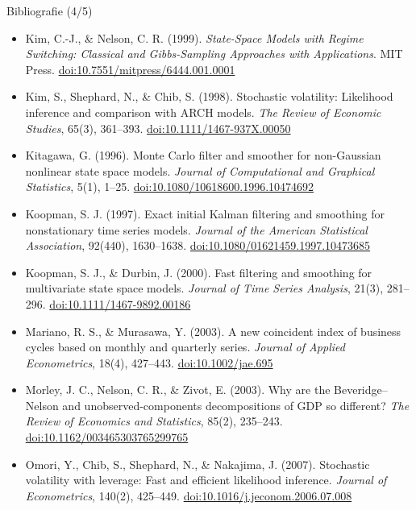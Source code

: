 \begin{frame}{Bibliografie (4/5)}
\itemsize{\tiny}
\begin{itemize}
    \item Kim, C.-J., \& Nelson, C. R. (1999). \textit{State-Space Models with Regime Switching: Classical and Gibbs-Sampling Approaches with Applications}. MIT Press. \href{https://doi.org/10.7551/mitpress/6444.001.0001}{doi:10.7551/mitpress/6444.001.0001}
    \item Kim, S., Shephard, N., \& Chib, S. (1998). Stochastic volatility: Likelihood inference and comparison with ARCH models. \textit{The Review of Economic Studies}, 65(3), 361--393. \href{https://doi.org/10.1111/1467-937X.00050}{doi:10.1111/1467-937X.00050}
    \item Kitagawa, G. (1996). Monte Carlo filter and smoother for non-Gaussian nonlinear state space models. \textit{Journal of Computational and Graphical Statistics}, 5(1), 1--25. \href{https://doi.org/10.1080/10618600.1996.10474692}{doi:10.1080/10618600.1996.10474692}
    \item Koopman, S. J. (1997). Exact initial Kalman filtering and smoothing for nonstationary time series models. \textit{Journal of the American Statistical Association}, 92(440), 1630--1638. \href{https://doi.org/10.1080/01621459.1997.10473685}{doi:10.1080/01621459.1997.10473685}
    \item Koopman, S. J., \& Durbin, J. (2000). Fast filtering and smoothing for multivariate state space models. \textit{Journal of Time Series Analysis}, 21(3), 281--296. \href{https://doi.org/10.1111/1467-9892.00186}{doi:10.1111/1467-9892.00186}
    \item Mariano, R. S., \& Murasawa, Y. (2003). A new coincident index of business cycles based on monthly and quarterly series. \textit{Journal of Applied Econometrics}, 18(4), 427--443. \href{https://doi.org/10.1002/jae.695}{doi:10.1002/jae.695}
    \item Morley, J. C., Nelson, C. R., \& Zivot, E. (2003). Why are the Beveridge--Nelson and unobserved-components decompositions of GDP so different? \textit{The Review of Economics and Statistics}, 85(2), 235--243. \href{https://doi.org/10.1162/003465303765299765}{doi:10.1162/003465303765299765}
    \item Omori, Y., Chib, S., Shephard, N., \& Nakajima, J. (2007). Stochastic volatility with leverage: Fast and efficient likelihood inference. \textit{Journal of Econometrics}, 140(2), 425--449. \href{https://doi.org/10.1016/j.jeconom.2006.07.008}{doi:10.1016/j.jeconom.2006.07.008}

\end{itemize}
\end{frame}
